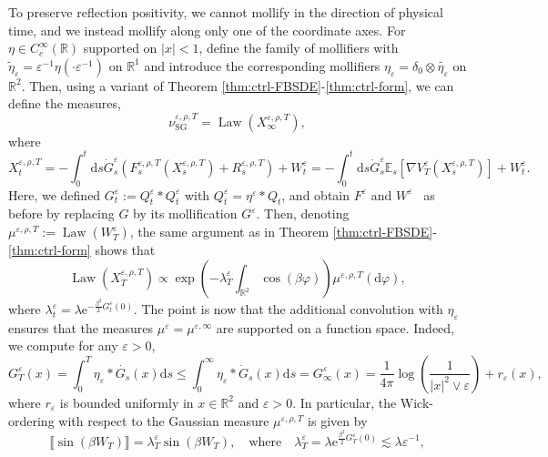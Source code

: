 \documentclass[11pt, a4paper]{scrartcl}
\numberwithin{equation}{section}
\theoremstyle{plain}
\theoremstyle{remark}
\newcommand{\assign}{:=}
\newcommand{\mathd}{\mathrm{d}}
\newcommand{\mathe}{\mathrm{e}}
\newcommand{\tmop}[1]{\ensuremath{\operatorname{#1}}}
\begin{document}
To preserve reflection positivity, we cannot mollify in the direction of physical time, and we instead mollify along only one of the coordinate axes. For $\eta \in C^{\infty}_c (\mathbb{R})$
supported on $| x | < 1$, define the family of mollifiers with
$\tilde{\eta}_{\varepsilon} = \varepsilon^{- 1} \eta (\cdot \varepsilon^{-
1})$ on $\mathbb{R}^1$ and introduce the corresponding mollifiers
$\eta_{\varepsilon} = \delta_0 \otimes \widetilde{\eta_{\varepsilon}}$ on
$\mathbb{R}^2$. Then, using a variant of Theorem
\ref{thm:ctrl-FBSDE}-\ref{thm:ctrl-form}, we can define the measures,
\[ \nu_{\tmop{SG}}^{\varepsilon, \rho, T} = \tmop{Law} (X^{\varepsilon, \rho,
   T}_{\infty}), \]
where
\begin{equation}
  X^{\varepsilon, \rho, T}_t = - \int_0^t \mathd s \dot{G}^{\varepsilon}_s
  (F^{\varepsilon, \rho, T}_s (X^{\varepsilon, \rho, T}_s) + R^{\varepsilon, \rho, T}_s) +
  W^{\varepsilon}_t = - \int_0^t \mathd s \dot{G}_s^{\varepsilon} \mathbb{E}_s
  [\nabla V_T^{\varepsilon} (X_s^{\varepsilon, \rho, T})] + W_t^{\varepsilon} .
  \label{eq:X-eps-T}
\end{equation}
Here, we defined $G^{\varepsilon}_t \assign Q_t^{\varepsilon} \ast
Q^{\varepsilon}_t$ with $Q_t^{\varepsilon} = \eta^{\varepsilon} \ast Q_t$, and
obtain $F^{\varepsilon}$ and $W^{\varepsilon}$ \ as before by replacing $G$ by
its mollification $G^{\varepsilon}$. Then, denoting $\mu^{\varepsilon, \rho, T}
\assign \tmop{Law} (W_T^{\varepsilon})$, the same argument as in Theorem
\ref{thm:ctrl-FBSDE}-\ref{thm:ctrl-form} shows that
\[ \tmop{Law} (X^{\varepsilon, \rho, T}_T) \propto \exp \left( -
   \lambda_T^{\varepsilon} \int_{\mathbb{R}^2} \cos (\beta \varphi) \right)
   \mu^{\varepsilon, \rho, T} (\mathd \varphi), \]
where $\lambda^{\varepsilon}_t = \lambda \mathe^{- \frac{\beta^2}{2}
G_t^{\varepsilon} (0)}$. The point is now that the additional convolution with
$\eta_{\varepsilon}$ ensures that the measures $\mu^{\varepsilon} =
\mu^{\varepsilon, \infty}$ are supported on a function space. Indeed, we
compute for any $\varepsilon > 0$,
\[ G^{\varepsilon}_T (x) = \int_0^T \eta_{\varepsilon} \ast \dot{G_s} (x)
   \mathd s \leqslant \int_0^{\infty} \eta_{\varepsilon} \ast \dot{G}_s (x)
   \mathd s = G^{\varepsilon}_{\infty} (x) = \frac{1}{4 \pi} \log \left(
   \frac{1}{| x |^2 \vee \varepsilon} \right) + r_{\varepsilon} (x), \]
where $r_{\varepsilon}$ is bounded uniformly in $x \in \mathbb{R}^2$ and
$\varepsilon > 0$. In particular, the Wick-ordering with respect to the
Gaussian measure $\mu^{\varepsilon, \rho, T}$ is given by
\[ \llbracket \sin (\beta W_T) \rrbracket = \lambda_T^{\varepsilon} \sin
   (\beta W_T), \quad \text{where} \quad \lambda^{\varepsilon}_T = \lambda
   \mathe^{\frac{\beta^2}{2} G_T^{\varepsilon} (0)} \lesssim \lambda
   \varepsilon^{- 1}, \]
\end{document}
